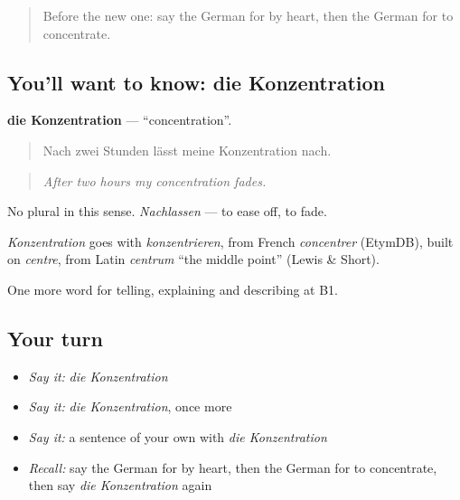 \label{lesson:GE-C376-konzentration}



\begin{quote}
Before the new one: say the German for by heart, then the German for to concentrate.
\end{quote}

\subsection*{You'll want to know: die Konzentration}
\textbf{die Konzentration} — \textquotedblleft{}concentration\textquotedblright{}.

\begin{quote}
Nach zwei Stunden lässt meine Konzentration nach.
\end{quote}

\begin{quote}
\emph{After two hours my concentration fades.}
\end{quote}

No plural in this sense. \emph{Nachlassen} — to ease off, to fade.

\begin{cousinweb}
\emph{Konzentration} goes with \emph{konzentrieren}, from French \emph{concentrer} (EtymDB), built on \emph{centre}, from Latin \emph{centrum} \textquotedblleft{}the middle point\textquotedblright{} (Lewis \& Short).
\end{cousinweb}

\begin{grammarlens}[title={What you've built}]
One more word for telling, explaining and describing at B1.
\end{grammarlens}

\subsection*{Your turn}
\begin{itemize}
\raggedright
  \item \emph{Say it:} \emph{die Konzentration}
  \item \emph{Say it:} \emph{die Konzentration}, once more
  \item \emph{Say it:} a sentence of your own with \emph{die Konzentration}
  \item \emph{Recall:} say the German for by heart, then the German for to concentrate, then say \emph{die Konzentration} again
\end{itemize}

